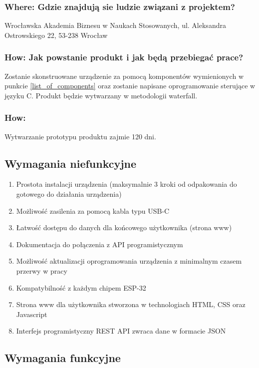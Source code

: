 \documentclass[12pt,a4paper]{article}
\begin{document}
\subsubsection{Where: Gdzie znajdują sie ludzie związani z projektem?}
Wrocławska Akademia Biznesu w Naukach Stosowanych, ul. Aleksandra Ostrowskiego 22, 53-238 Wrocław

\subsubsection{How: Jak powstanie produkt i jak będą przebiegać prace?}

Zostanie skonstruowane urządzenie za pomocą komponentów wymienionych w punkcie \ref{list_of_components} oraz zostanie napisane 
oprogramowanie sterujące w języku C. Produkt będzie wytwarzany w metodologii waterfall.

\subsubsection{How: }

Wytwarzanie prototypu produktu zajmie 120 dni.

\subsection{Wymagania niefunkcyjne}

\begin{enumerate}
    \item Prostota instalacji urządzenia (maksymalnie 3 kroki od odpakowania do gotowego do działania urządzenia)
    \item Możliwość zasilenia za pomocą kabla typu USB-C
    \item Łatwość dostępu do danych dla końcowego użytkownika (strona www)
    \item Dokumentacja do połączenia z API programistycznym
    \item Możliwość aktualizacji oprogramowania urządzenia z minimalnym czasem przerwy w pracy
    \item Kompatybilność z każdym chipem ESP-32
    \item Strona www dla użytkownika stworzona w technologiach HTML, CSS oraz Javascript
    \item Interfejs programistyczny REST API zwraca dane w formacie JSON
\end{enumerate}

\subsection{Wymagania funkcyjne}
\end{document}
